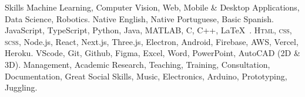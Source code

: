 
\begin{rubric}{Skills}
  Machine Learning, Computer Vision, Web, Mobile \& Desktop Applications, Data Science, Robotics.
  \vspace{0.05cm}
  Native English, Native Portuguese, Basic Spanish.
  \vspace{0.05cm}
  JavaScript, TypeScript, Python, Java, MATLAB, C, C++, \LaTeX\ .
  \vspace{0.05cm}
  \textsc{Html, css, scss}, Node.js, React, Next.js, Three.js, Electron, Android, Firebase, AWS, Vercel, Heroku.
  \vspace{0.05cm}
  VScode, Git, Github, Figma, Excel, Word, PowerPoint, AutoCAD (2D \& 3D).
  \vspace{0.05cm}
  \entry*[Misc.]
  Management, Academic Research, Teaching, Training, Consultation, Documentation, Great Social Skills, Music, Electronics, Arduino, Prototyping, Juggling.
\end{rubric}
